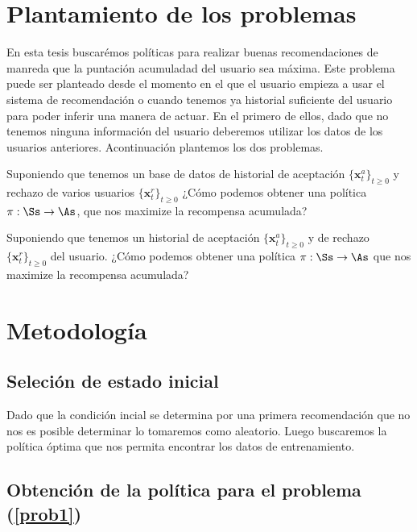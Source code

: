 \section{Plantamiento de los problemas}

En esta tesis buscarémos políticas para realizar buenas recomendaciones de manreda que la puntación acumuladad del usuario sea máxima. Este problema puede ser planteado desde el momento en el que el usuario empieza a usar el sistema de recomendación o cuando tenemos ya historial suficiente del usuario para poder inferir una manera de actuar. En el primero de ellos, dado que no tenemos ninguna información del usuario deberemos utilizar los datos de los usuarios anteriores. Acontinuación plantemos los dos problemas.

\begin{problem}\label{prob1}
    Suponiendo que tenemos un base de datos de historial de aceptación $\{ \bm{x}_t^a\}_{t\geq 0}$ y rechazo de varios usuarios $\{ \bm{x}_t^r\}_{t\geq 0}$ ¿Cómo podemos obtener una política $\pi: \Ss \rightarrow \As $, que nos maximize la recompensa acumulada?
\end{problem}

\begin{problem}\label{prob2}
    Suponiendo que tenemos un historial de aceptación $\{ \bm{x}_t^a\}_{t\geq 0}$ y de rechazo $\{ \bm{x}_t^r\}_{t\geq 0}$ del usuario. ¿Cómo podemos obtener una política $\pi: \Ss \rightarrow \As $ que nos maximize la recompensa acumulada?
\end{problem}






\section{Metodología}


\subsection{Seleción de estado inicial}

Dado que la condición incial se determina por una primera recomendación que no nos es posible determinar lo tomaremos como aleatorio. Luego buscaremos la política óptima que nos permita encontrar los datos de entrenamiento. 

\subsection{Obtención de la política para el problema (\ref{prob1})}

